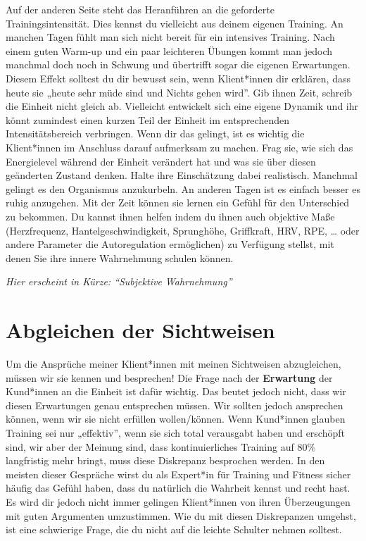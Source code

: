 \documentclass[
  letterpaper,
  DIV=11,
  numbers=noendperiod]{scrreprt}
\begin{document}
Auf der anderen Seite steht das Heranführen an die geforderte
Trainingsintensität. Dies kennst du vielleicht aus deinem eigenen
Training. An manchen Tagen fühlt man sich nicht bereit für ein
intensives Training. Nach einem guten Warm-up und ein paar leichteren
Übungen kommt man jedoch manchmal doch noch in Schwung und übertrifft
sogar die eigenen Erwartungen. Diesem Effekt solltest du dir bewusst
sein, wenn Klient*innen dir erklären, dass heute sie „heute sehr müde
sind und Nichts gehen wird''. Gib ihnen Zeit, schreib die Einheit nicht
gleich ab. Vielleicht entwickelt sich eine eigene Dynamik und ihr könnt
zumindest einen kurzen Teil der Einheit im entsprechenden
Intensitätsbereich verbringen. Wenn dir das gelingt, ist es wichtig die
Klient*innen im Anschluss darauf aufmerksam zu machen. Frag sie, wie
sich das Energielevel während der Einheit verändert hat und was sie über
diesen geänderten Zustand denken. Halte ihre Einschätzung dabei
realistisch. Manchmal gelingt es den Organismus anzukurbeln. An anderen
Tagen ist es einfach besser es ruhig anzugehen. Mit der Zeit können sie
lernen ein Gefühl für den Unterschied zu bekommen. Du kannst ihnen
helfen indem du ihnen auch objektive Maße (Herzfrequenz,
Hantelgeschwindigkeit, Sprunghöhe, Griffkraft, HRV, RPE, \ldots{} oder
andere Parameter die Autoregulation ermöglichen) zu Verfügung stellst,
mit denen Sie ihre innere Wahrnehmung schulen können.

\emph{Hier erscheint in Kürze: ``Subjektive Wahrnehmung''}

\section{Abgleichen der Sichtweisen}\label{abgleichen-der-sichtweisen}

Um die Ansprüche meiner Klient*innen mit meinen Sichtweisen
abzugleichen, müssen wir sie kennen und besprechen! Die Frage nach der
\textbf{Erwartung} der Kund*innen an die Einheit ist dafür wichtig. Das
beutet jedoch nicht, dass wir diesen Erwartungen genau entsprechen
müssen. Wir sollten jedoch ansprechen können, wenn wir sie nicht
erfüllen wollen/können. Wenn Kund*innen glauben Training sei nur
„effektiv'', wenn sie sich total verausgabt haben und erschöpft sind,
wir aber der Meinung sind, dass kontinuierliches Training auf 80\%
langfristig mehr bringt, muss diese Diskrepanz besprochen werden. In den
meisten dieser Gespräche wirst du als Expert*in für Training und Fitness
sicher häufig das Gefühl haben, dass du natürlich die Wahrheit kennst
und recht hast. Es wird dir jedoch nicht immer gelingen Klient*innen von
ihren Überzeugungen mit guten Argumenten umzustimmen. Wie du mit diesen
Diskrepanzen umgehst, ist eine schwierige Frage, die du nicht auf die
leichte Schulter nehmen solltest.
\end{document}

